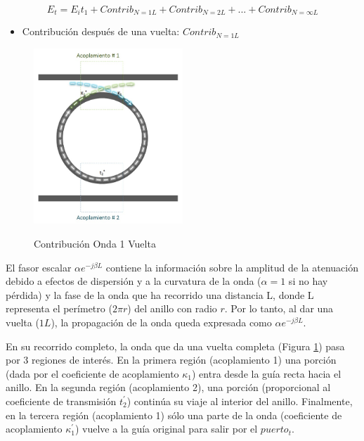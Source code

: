 \begin{equation}
E_t = E_i t_1 + Contrib_{N=1L} + Contrib_{N=2L} + ... + Contrib_{N=\infty L}
\label{eq:coupling_gral}
\end{equation} 

\begin{itemize}
\item Contribución después de una vuelta: $Contrib_{N=1L}$
\end{itemize} 


\begin{figure}[h!]
\caption{Contribución Onda 1 Vuelta}
\centering
\includegraphics[width=0.5\textwidth,natwidth=573,natheight=674]{figs/rr_n1.jpg}
\label{fig:rr_n1}
\end{figure} 

El fasor escalar $\alpha e^{-j \beta L}$ contiene la información sobre la amplitud de
la atenuación debido a efectos de dispersión y a la curvatura de la onda 
($\alpha=1$ si no hay pérdida)
y la fase de la onda que ha recorrido una distancia L, 
donde L representa el perímetro ($2 \pi r$) del anillo con radio $r$. 
Por lo tanto, al dar una vuelta ($1L$), la propagación de la onda queda expresada como 
$\alpha e^{-j \beta L}$.

En su recorrido completo, la onda que da una vuelta completa (Figura \ref{fig:rr_n1}) 
pasa por 3 regiones de interés. 
En la primera región (acoplamiento 1) una porción (dada por el coeficiente de acoplamiento 
$\kappa_1$) entra desde la guía recta hacia el anillo.
En la segunda región (acoplamiento 2), una porción (proporcional al coeficiente de transmisión 
$t_2^{'}$) continúa su viaje al interior del anillo.
Finalmente, en la tercera región (acoplamiento 1) sólo una parte de la onda 
(coeficiente de acoplamiento $\kappa_1^{'}$) vuelve a la guía original para 
salir por el $puerto_t$. 


